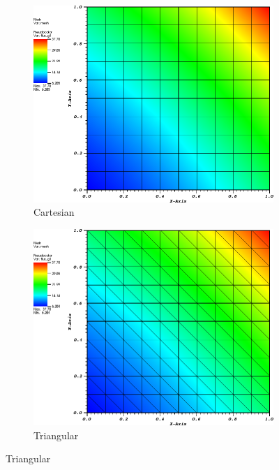 \begin{figure}
\centering
{
	\begin{subfigure}[b]{0.465\textwidth}
		\centering
		\label{subfig::cart_me_k2_lin_sol}
		\includegraphics[width=\textwidth]{figures/sec_BF/quad_sol_cart.png}
		\caption{Cartesian}
	\end{subfigure}
	\hfill
	\begin{subfigure}[b]{0.465\textwidth}
		\centering
		\label{subfig::tri_me_k2_lin_sol}
		\includegraphics[width=\textwidth]{figures/sec_BF/quad_sol_tri.png}
		\caption{Triangular}
	\end{subfigure}
}
\end{figure}
